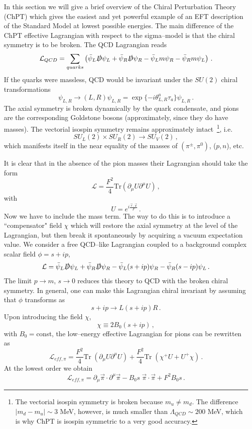 \documentclass[11pt,a4paper]{article}
\newcommand{\be}{\begin{equation}}
\newcommand{\ee}{\end{equation}}
\newcommand\m{\mu}
\renewcommand\t{\theta}
\def\d{\partial}
\begin{document}
In this section we will give a brief overview of the Chiral Perturbation Theory (ChPT) which
gives the easiest and yet powerful example of an EFT description
of the Standard Model at lowest possible energies.
The main difference of the ChPT effective Lagrangian with respect to the sigma--model is that
the chiral symmetry is to be broken.
The QCD Lagrangian reads
\be
\mathcal{L}_{QCD}=\sum_{quarks}\left(\bar\psi_L \slashed{D}\psi_L+\bar\psi_R \slashed{D}\psi_R -\bar \psi_L m \psi_R-\bar \psi_R m \psi_L\right)\,.
\ee
If the quarks were massless, QCD would be invariant under the $SU(2)$ chiral transformations
\be
\psi_{L,R}\to (L,R)\psi_{L,R}=\exp\{-i\t^a_{L,R}\tau_a\}  \psi_{L,R}\,.
\ee
The axial symmetry is broken dynamically by the quark condensate,
and pions are the corresponding Goldstone bosons
(approximately, since they do have masses). The vectorial isospin symmetry remains approximately
intact~\footnote{
The vectorial isospin symmetry is broken because $m_u\neq m_d$. The difference
$|m_d-m_u|\sim 3$ MeV, however, is much
smaller than $\Lambda_{QCD}\sim 200$ MeV, which is why
ChPT is isospin symmetric to a very good accuracy.
},
 i.e.
\be
SU_L(2)\times  SU_R(2) \to SU_V(2)\,,
\ee
which manifests itself in the near equality of the masses of $(\pi^{\pm},\pi^0)$, ($p,n$), etc.

It is clear that in the absence of the pion masses their Lagrangian should take the form
\be
\mathcal{L}= \frac{F^2}{4}\text{Tr}\left(\d_\m U\d^\mu U\right)\,,
\ee
with
\be
 U=e^{i\frac{\vec{\tau}\cdot \vec{\pi}}{F}}\,.
\ee
Now we have to include the mass term.
The way to do this is to introduce a ``compensator" field $\chi$
which will restore the axial symmetry at the level of the Lagrangian, but then break it
spontaneously by acquiring a vacuum expectation value.
We consider a free QCD--like Lagrangian coupled to a
background complex scalar field $\phi=s+i p$,
\be
 \mathcal{L}=\bar\psi_L \slashed{D}\psi_L+\bar\psi_R \slashed{D}\psi_R  -\bar \psi_L (s+ip) \psi_R-\bar \psi_R (s-ip)\psi_L\,.
\ee
The limit $p\to m$, $s\to 0$ reduces this theory to QCD with the broken chiral symmetry.
In general, one can make this Lagrangian chiral invariant by assuming that $\phi$
transforms as
\be
s+ip \to L (s+ip)R\,.
\ee
Upon introducing the field $\chi$,
\be
\chi\equiv 2B_0 (s+ip)\,,
\ee
with $B_0=$const, the low--energy effective Lagrangian for pions can be rewritten as
\be
\mathcal{L}_{eff,\pi}=\frac{F^2}{4}\text{Tr}\; \left(\d_\m U\d^\mu U \right) +
\frac{F^2}{4}\text{Tr}\;\left(\chi^+U + U^+ \chi\right)\,.
\ee
At the lowest order we obtain
\be
 \mathcal{L}_{eff,\pi}=\d_\m \vec{\pi}\cdot \d^\m \vec{\pi}-B_0s\; \vec{\pi}\cdot \vec{\pi}+F^2B_0s\,.
\ee
\end{document}

